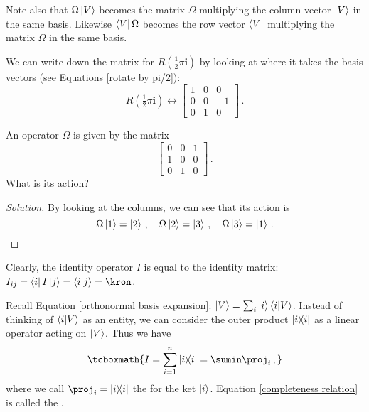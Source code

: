 Note also that $\Omega \ket{V}$ becomes the matrix $\Omega$ multiplying the column vector $\ket{V}$ in the same basis. Likewise $\bra{V} \Omega$ becomes the row vector $\bra{V}$ multiplying the matrix $\Omega$ in the same basis.

\begin{example}\label{rotation matrix for pi/2}
We can write down the matrix for $R(\frac{1}{2}\pi \bm{i})$ by looking at where it takes the basis vectors (see Equations \eqref{rotate by pi/2}):
\begin{equation}
    R(\tfrac{1}{2}\pi \bm{i}) \leftrightarrow
    \begin{bmatrix}
    1 & 0 & 0 \\
    0 & 0 & -1 \\
    0 & 1 & 0
    \end{bmatrix}\,.
\end{equation}
\end{example}

\begin{exercise}
An operator $\Omega$ is given by the matrix
\begin{equation}
    \begin{bmatrix}
    0 & 0 & 1 \\
    1 & 0 & 0 \\
    0 & 1 & 0
    \end{bmatrix}\,.
\end{equation}
What is its action?
\end{exercise}

\begin{proof}[Solution]
By looking at the columns, we can see that its action is
\begin{equation}
    \Omega \ket{1} = \ket{2}\,, \quad \Omega \ket{2} = \ket{3}\,, \quad \Omega \ket{3} = \ket{1}\,.
\end{equation}
\end{proof}

Clearly, the identity operator $I$ is equal to the identity matrix: $I_{ij} = \bra{i}I\ket{j} = \braket{i}{j} = \kron$.

Recall Equation \eqref{orthonormal basis expansion}: $\ket{V} = \sum_i \ket{i} \braket{i}{V}$. Instead of thinking of $\braket{i}{V}$ as an entity, we can consider the outer product $\ketbra{i}$ as a linear operator acting on $\ket{V}$. Thus we have
\begin{equation}\label{completeness relation}
    \tcboxmath{I = \sum^n_{i = 1} \ketbra{i} = \sumin \proj_i\,,}
\end{equation}
where we call $\proj_i = \ketbra{i}$ the  for the ket $\ket{i}$. Equation \eqref{completeness relation} is called the .

